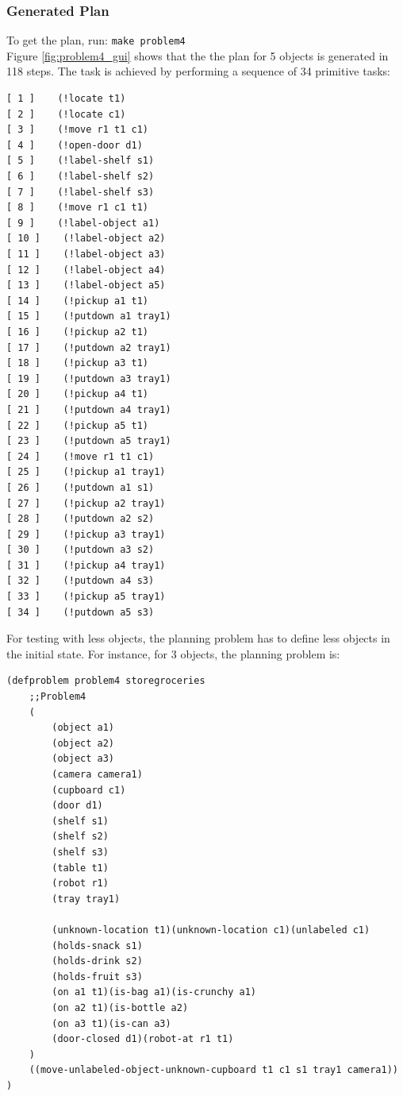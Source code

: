 \documentclass[paper=a4, fontsize=11pt]{scrartcl}
\begin{document}
	\subsubsection*{Generated Plan}

	To get the plan, run: \verb|make problem4| \\

	Figure \ref{fig:problem4_gui} shows that the the plan for 5 objects is generated in 118 steps. The task is achieved by performing a sequence of 34 primitive tasks: \\

	\begin{lstlisting}
[ 1 ]    (!locate t1)
[ 2 ]    (!locate c1)
[ 3 ]    (!move r1 t1 c1)
[ 4 ]    (!open-door d1)
[ 5 ]    (!label-shelf s1)
[ 6 ]    (!label-shelf s2)
[ 7 ]    (!label-shelf s3)
[ 8 ]    (!move r1 c1 t1)
[ 9 ]    (!label-object a1)
[ 10 ]    (!label-object a2)
[ 11 ]    (!label-object a3)
[ 12 ]    (!label-object a4)
[ 13 ]    (!label-object a5)
[ 14 ]    (!pickup a1 t1)
[ 15 ]    (!putdown a1 tray1)
[ 16 ]    (!pickup a2 t1)
[ 17 ]    (!putdown a2 tray1)
[ 18 ]    (!pickup a3 t1)
[ 19 ]    (!putdown a3 tray1)
[ 20 ]    (!pickup a4 t1)
[ 21 ]    (!putdown a4 tray1)
[ 22 ]    (!pickup a5 t1)
[ 23 ]    (!putdown a5 tray1)
[ 24 ]    (!move r1 t1 c1)
[ 25 ]    (!pickup a1 tray1)
[ 26 ]    (!putdown a1 s1)
[ 27 ]    (!pickup a2 tray1)
[ 28 ]    (!putdown a2 s2)
[ 29 ]    (!pickup a3 tray1)
[ 30 ]    (!putdown a3 s2)
[ 31 ]    (!pickup a4 tray1)
[ 32 ]    (!putdown a4 s3)
[ 33 ]    (!pickup a5 tray1)
[ 34 ]    (!putdown a5 s3)

	\end{lstlisting}

	\vspace{5mm}

	For testing with less objects, the planning problem has to define less objects in the initial state. For instance, for 3 objects, the planning problem is: \\

	\begin{lstlisting}
(defproblem problem4 storegroceries
	;;Problem4
	(
		(object a1)
		(object a2)
		(object a3)
		(camera camera1)
		(cupboard c1)
		(door d1)
		(shelf s1)
		(shelf s2)
		(shelf s3)
		(table t1)
		(robot r1)
		(tray tray1)

		(unknown-location t1)(unknown-location c1)(unlabeled c1)
		(holds-snack s1)
		(holds-drink s2)
		(holds-fruit s3)
		(on a1 t1)(is-bag a1)(is-crunchy a1)
		(on a2 t1)(is-bottle a2)
		(on a3 t1)(is-can a3)
		(door-closed d1)(robot-at r1 t1)
	)
	((move-unlabeled-object-unknown-cupboard t1 c1 s1 tray1 camera1))
)
	\end{lstlisting}
\end{document}
